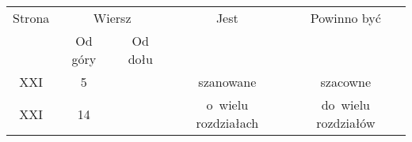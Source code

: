 \documentclass[a4paper,11pt]{article}
\numberwithin{equation}{section}
\begin{document}























\newpage



\begin{center}

  \begin{tabular}{|c|c|c|c|c|}
    \hline
    Strona & \multicolumn{2}{c|}{Wiersz} & Jest
                              & Powinno być \\ \cline{2-3}
    & Od góry & Od dołu & & \\
    \hline
    XXI & 5 & & szanowane & szacowne \\
    XXI & 14 & & o~wielu rozdziałach & do~wielu rozdziałów \\
    \hline
  \end{tabular}

\end{center}
\end{document}
